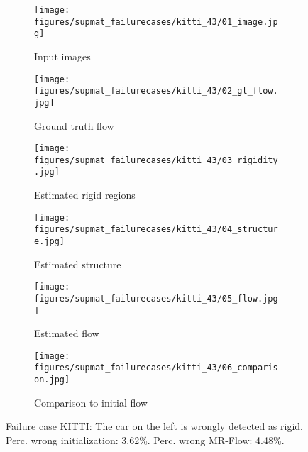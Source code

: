 \documentclass[10pt,twocolumn,letterpaper]{article}
\begin{document}
\begin{figure*}[ht]
\captionsetup{justification=centering}
\centering
\begin{subfigure}[t]{\failurewidth}
	\texttt{[image: figures/supmat\_failurecases/kitti\_43/01\_image.jpg]}
	\caption{Input images}
\end{subfigure}\begin{subfigure}[t]{\failurewidth}
	\texttt{[image: figures/supmat\_failurecases/kitti\_43/02\_gt\_flow.jpg]}
	\caption{Ground truth flow}
\end{subfigure}\begin{subfigure}[t]{\failurewidth}
	\texttt{[image: figures/supmat\_failurecases/kitti\_43/03\_rigidity.jpg]}
	\caption{Estimated rigid regions}
\end{subfigure}
\begin{subfigure}[t]{\failurewidth}
	\texttt{[image: figures/supmat\_failurecases/kitti\_43/04\_structure.jpg]}
	\caption{Estimated structure}
\end{subfigure}\begin{subfigure}[t]{\failurewidth}
	\texttt{[image: figures/supmat\_failurecases/kitti\_43/05\_flow.jpg]}
	\caption{Estimated flow}
\end{subfigure}\begin{subfigure}[t]{\failurewidth}
	\texttt{[image: figures/supmat\_failurecases/kitti\_43/06\_comparison.jpg]}
	\caption{Comparison to initial flow}
\end{subfigure}
\caption{Failure case KITTI: The car on the left is wrongly detected as rigid. \\ Perc. wrong initialization: 3.62\%. Perc. wrong MR-Flow: 4.48\%. }
\label{fig:failure_kitti_clean}
\end{figure*}
\end{document}
